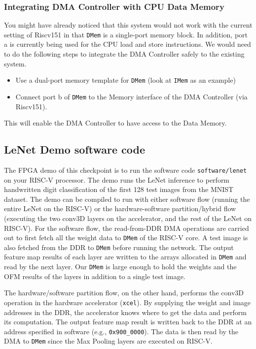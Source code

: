 \documentclass[11pt]{article}
\begin{document}
\subsubsection{Integrating DMA Controller with CPU Data Memory}

You might have already noticed that this system would not work with the current setting of Riscv151 in that \texttt{DMem} is a single-port memory block. In addition, port a is currently being used for the CPU load and store instructions. We would need to do the following steps to integrate the DMA Controller safely to the existing system.

\begin{itemize}
\item Use a dual-port memory template for \texttt{DMem} (look at \texttt{IMem} as an example)
\item Connect port b of \texttt{DMem} to the Memory interface of the DMA Controller (via Riscv151).
\end{itemize}

This will enable the DMA Controller to have access to the Data Memory.
\subsection{LeNet Demo software code}

The FPGA demo of this checkpoint is to run the software code \verb|software/lenet| on your RISC-V processor. The demo runs the LeNet inference to perform handwritten digit classification of the first 128 test images from the MNIST dataset. The demo can be compiled to run with either software flow (running the entire LeNet on the RISC-V) or the hardware-software partition/hybrid flow (executing the two conv3D layers on the accelerator, and the rest of the LeNet on RISC-V). For the software flow, the read-from-DDR DMA operations are carried out to first fetch all the weight data to \texttt{DMem} of the RISC-V core. A test image is also fetched from the DDR to \texttt{DMem} before running the network. The output feature map results of each layer are written to the arrays allocated in \texttt{DMem} and read by the next layer. Our \texttt{DMem} is large enough to hold the weights and the OFM results of the layers in addition to a single test image.

The hardware/software partition flow, on the other hand, performs the conv3D operation in the hardware accelerator (\texttt{xcel}). By supplying the weight and image addresses in the DDR, the accelerator knows where to get the data and perform its computation. The output feature map result is written back to the DDR at an address specified in software (e.g., \texttt{0x900\_0000}). The data is then read by the DMA to \texttt{DMem} since the Max Pooling layers are executed on RISC-V.
\end{document}
